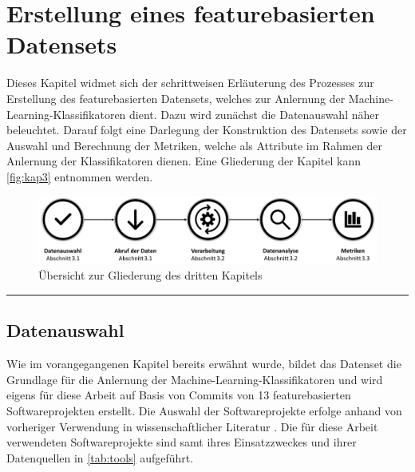 
\chapter{Erstellung eines featurebasierten Datensets}
\label{dataset-creation}

Dieses Kapitel widmet sich der schrittweisen Erläuterung des Prozesses zur Erstellung des featurebasierten Datensets, welches zur Anlernung der Machine-Learning-Klassifikatoren dient. Dazu wird zunächst die Datenauswahl näher beleuchtet. Darauf folgt eine Darlegung der Konstruktion des Datensets sowie der Auswahl und Berechnung der Metriken, welche als Attribute im Rahmen der Anlernung der Klassifikatoren dienen. Eine Gliederung der Kapitel kann \autoref{fig:kap3} entnommen werden.

\begin{figure}[H]
    \centering
    \includegraphics[width=\textwidth]{images/Kap3}
    \caption{Übersicht zur Gliederung des dritten Kapitels\label{fig:kap3}}
\end{figure}

\hrule

\section{Datenauswahl}

Wie im vorangegangenen Kapitel bereits erwähnt wurde, bildet das Datenset die Grundlage für die Anlernung der Machine-Learning-Klassifikatoren und wird eigens für diese Arbeit auf Basis von Commits von 13 featurebasierten Softwareprojekten erstellt. Die Auswahl der Softwareprojekte erfolge anhand von vorheriger Verwendung in wissenschaftlicher Literatur \cite{Hunsen2015,Liebig2010,Queiroz2016}. Die für diese Arbeit verwendeten Softwareprojekte sind samt ihres Einsatzzweckes und ihrer Datenquellen in \autoref{tab:tools} aufgeführt.

